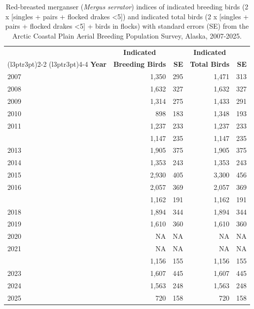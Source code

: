 \documentclass[
]{article}
\begin{document}
\begin{longtable}[t]{lrrrr}

\caption{\label{tbl-RBME}Red-breasted merganser (\emph{Mergus serrator})
indices of indicated breeding birds (2 x {[}singles + pairs + flocked
drakes \textless5{]}) and indicated total birds (2 x {[}singles + pairs
+ flocked drakes \textless5{]} + birds in flocks) with standard errors
(SE) from the Arctic Coastal Plain Aerial Breeding Population Survey,
Alaska, 2007-2025.}

\tabularnewline

\\
\toprule
\multicolumn{1}{c}{\textbf{ }} & \multicolumn{1}{c}{\textbf{Indicated}} & \multicolumn{1}{c}{\textbf{ }} & \multicolumn{1}{c}{\textbf{Indicated}} & \multicolumn{1}{c}{\textbf{ }} \\
\cmidrule(l{3pt}r{3pt}){2-2} \cmidrule(l{3pt}r{3pt}){4-4}
\textbf{Year} & \textbf{Breeding Birds} & \textbf{SE} & \textbf{Total Birds} & \textbf{SE}\\
\midrule
2007 & 1,350 & 295 & 1,471 & 313\\
2008 & 1,632 & 327 & 1,632 & 327\\
2009 & 1,314 & 275 & 1,433 & 291\\
2010 & 898 & 183 & 1,348 & 193\\
2011 & 1,237 & 233 & 1,237 & 233\\
\addlinespace
2012 & 1,147 & 235 & 1,147 & 235\\
2013 & 1,905 & 375 & 1,905 & 375\\
2014 & 1,353 & 243 & 1,353 & 243\\
2015 & 2,930 & 405 & 3,300 & 456\\
2016 & 2,057 & 369 & 2,057 & 369\\
\addlinespace
2017 & 1,162 & 191 & 1,162 & 191\\
2018 & 1,894 & 344 & 1,894 & 344\\
2019 & 1,610 & 360 & 1,610 & 360\\
2020 & NA & NA & NA & NA\\
2021 & NA & NA & NA & NA\\
\addlinespace
2022 & 1,156 & 155 & 1,156 & 155\\
2023 & 1,607 & 445 & 1,607 & 445\\
2024 & 1,563 & 248 & 1,563 & 248\\
2025 & 720 & 158 & 720 & 158\\
\bottomrule

\end{longtable}
\end{document}
